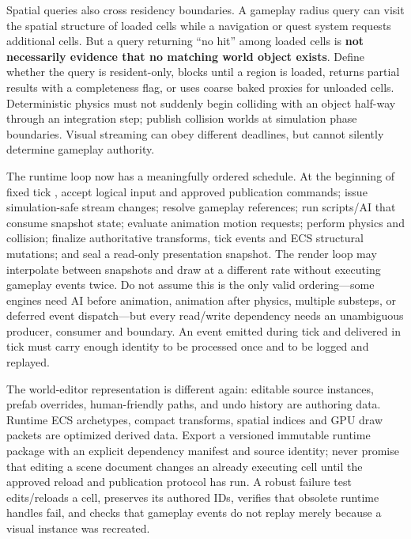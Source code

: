 Spatial queries also cross residency boundaries. A gameplay radius query can visit the spatial structure of loaded cells while a navigation or quest system requests additional cells. But a query returning ``no hit'' among loaded cells is \textbf{not necessarily evidence that no matching world object exists}. Define whether the query is resident-only, blocks until a region is loaded, returns partial results with a completeness flag, or uses coarse baked proxies for unloaded cells. Deterministic physics must not suddenly begin colliding with an object half-way through an integration step; publish collision worlds at simulation phase boundaries. Visual streaming can obey different deadlines, but cannot silently determine gameplay authority.

The runtime loop now has a meaningfully ordered schedule. At the beginning of fixed tick , accept logical input and approved publication commands; issue simulation-safe stream changes; resolve gameplay references; run scripts/AI that consume snapshot state; evaluate animation motion requests; perform physics and collision; finalize authoritative transforms, tick events and ECS structural mutations; and seal a read-only presentation snapshot. The render loop may interpolate between snapshots and draw at a different rate without executing gameplay events twice. Do not assume this is the only valid ordering---some engines need AI before animation, animation after physics, multiple substeps, or deferred event dispatch---but every read/write dependency needs an unambiguous producer, consumer and boundary. An event emitted during tick  and delivered in tick  must carry enough identity to be processed once and to be logged and replayed.

The world-editor representation is different again: editable source instances, prefab overrides, human-friendly paths, and undo history are authoring data. Runtime ECS archetypes, compact transforms, spatial indices and GPU draw packets are optimized derived data. Export a versioned immutable runtime package with an explicit dependency manifest and source identity; never promise that editing a scene document changes an already executing cell until the approved reload and publication protocol has run. A robust failure test edits/reloads a cell, preserves its authored IDs, verifies that obsolete runtime handles fail, and checks that gameplay events do not replay merely because a visual instance was recreated.

